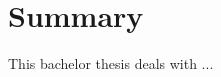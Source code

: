 
\chapter*{Summary}
\begin{otherlanguage}{english}
This bachelor thesis deals with ...
\end{otherlanguage}


